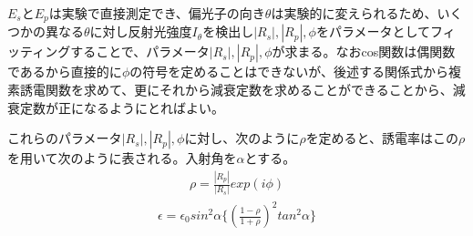 \documentclass[11pt]{article}
\begin{document}
$E_s$と$E_p$は実験で直接測定でき、偏光子の向き$\theta$は実験的に変えられるため、いくつかの異なる$\theta$に対し反射光強度$I_{\theta}$を検出し$|R_s|,|R_p|,\phi$をパラメータとしてフィッティングすることで、パラメータ$|R_s|,|R_p|,\phi$が求まる。なおcos関数は偶関数であるから直接的に$\phi$の符号を定めることはできないが、後述する関係式から複素誘電関数を求めて、更にそれから減衰定数を求めることができることから、減衰定数が正になるようにとればよい。\cite{sample}

これらのパラメータ$|R_s|,|R_p|,\phi$に対し、次のように$\rho$を定めると、誘電率はこの$\rho$を用いて次のように表される。入射角を$\alpha$とする。
\begin{eqnarray*}
\rho=\frac{|R_p|}{|R_s|}exp(i\phi)
\end{eqnarray*}
\begin{eqnarray*}
\epsilon=\epsilon_0 sin^2\alpha \{(\frac{1-\rho}{1+\rho})^2 tan^2\alpha\}
\end{eqnarray*}



\end{document}
